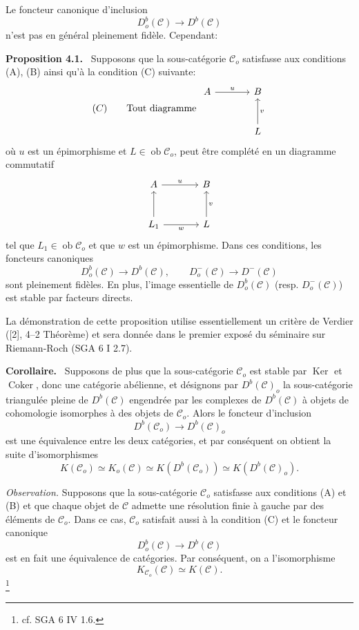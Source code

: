 \documentclass[11pt]{article}
\newenvironment{statement}[1]{\par\medskip\noindent\textbf{#1.}\ }{\par\medskip}
\providecommand{\Ker}{\operatorname{Ker}}
\providecommand{\Coker}{\operatorname{Coker}}
\providecommand{\Ob}{\operatorname{ob}}
\providecommand{\cC}{\mathcal C}
\providecommand{\Ker}{\operatorname{Ker}}
\providecommand{\Coker}{\operatorname{Coker}}
\providecommand{\Ker}{\operatorname{Ker}}
\providecommand{\Coker}{\operatorname{Coker}}
\providecommand{\Ob}{\operatorname{ob}}
\providecommand{\cC}{\mathcal C}
\providecommand{\Ob}{\operatorname{Ob}}
\providecommand{\Ob}{\operatorname{ob}}
\begin{document}
Le foncteur canonique d'inclusion
\[
D_o^b(\cC)\longrightarrow D^b(\cC)
\]
n'est pas en général pleinement fidèle. Cependant:

\begin{statement}{Proposition 4.1}
Supposons que la sous-catégorie $\cC_o$ satisfasse aux conditions (A), (B) ainsi qu'à la condition (C) suivante:
\[
(C)\qquad
\text{Tout diagramme }
\begin{tikzcd}[column sep=large,row sep=large]
A \arrow[r,"u"]&B\\
&L \arrow[u,"v"']
\end{tikzcd}
\]
où $u$ est un épimorphisme et $L\in\Ob\cC_o$, peut être complété en un diagramme commutatif
\[
\begin{tikzcd}[column sep=large,row sep=large]
A \arrow[r,"u"]&B\\
L_1 \arrow[u] \arrow[r,"w"']&L \arrow[u,"v"']
\end{tikzcd}
\]
tel que $L_1\in\Ob\cC_o$ et que $w$ est un épimorphisme. Dans ces conditions, les foncteurs canoniques
\[
D_o^b(\cC)\longrightarrow D^b(\cC),\qquad
D_o^-(\cC)\longrightarrow D^-(\cC)
\]
sont pleinement fidèles. En plus, l'image essentielle de $D_o^b(\cC)$ (resp. $D_o^-(\cC)$) est stable par facteurs directs.
\end{statement}

La démonstration de cette proposition utilise essentiellement un critère de Verdier ([2], 4--2 Théorème) et sera donnée dans le premier exposé du séminaire sur Riemann-Roch (SGA 6 I 2.7).

\begin{statement}{Corollaire}
Supposons de plus que la sous-catégorie $\cC_o$ est stable par $\Ker$ et $\Coker$, donc une catégorie abélienne, et désignons par $D^b(\cC)_o$ la sous-catégorie triangulée pleine de $D^b(\cC)$ engendrée par les complexes de $D^b(\cC)$ à objets de cohomologie isomorphes à des objets de $\cC_o$. Alors le foncteur d'inclusion
\[
D^b(\cC_o)\longrightarrow D^b(\cC)_o
\]
est une équivalence entre les deux catégories, et par conséquent on obtient la suite d'isomorphismes
\[
K(\cC_o)\simeq K_o(\cC)\simeq K(D^b(\cC_o))\simeq K(D^b(\cC)_o).
\tag{*}
\]
\end{statement}

\emph{Observation.} Supposons que la sous-catégorie $\cC_o$ satisfasse aux conditions (A) et (B) et que chaque objet de $\cC$ admette une résolution finie à gauche par des éléments de $\cC_o$. Dans ce cas, $\cC_o$ satisfait aussi à la condition (C) et le foncteur canonique
\[
D_o^b(\cC)\longrightarrow D^b(\cC)
\]
est en fait une équivalence de catégories. Par conséquent, on a l'isomorphisme
\[
K_{\cC_o}(\cC)\simeq K(\cC).
\]
\footnote{cf. SGA 6 IV 1.6.}
\end{document}
